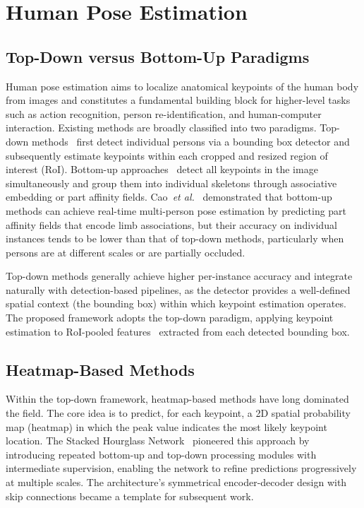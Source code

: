 \section{Human Pose Estimation}
\label{sec:rw_pose}

\subsection*{Top-Down versus Bottom-Up Paradigms}

Human pose estimation aims to localize anatomical keypoints of the human body from images and constitutes a fundamental building block for higher-level tasks such as action recognition, person re-identification, and human-computer interaction. Existing methods are broadly classified into two paradigms. Top-down methods~\cite{xiao2018simple, sun2019hrnet} first detect individual persons via a bounding box detector and subsequently estimate keypoints within each cropped and resized region of interest (RoI). Bottom-up approaches~\cite{cao2017realtime} detect all keypoints in the image simultaneously and group them into individual skeletons through associative embedding or part affinity fields. Cao~\emph{et al.}~\cite{cao2017realtime} demonstrated that bottom-up methods can achieve real-time multi-person pose estimation by predicting part affinity fields that encode limb associations, but their accuracy on individual instances tends to be lower than that of top-down methods, particularly when persons are at different scales or are partially occluded.

Top-down methods generally achieve higher per-instance accuracy and integrate naturally with detection-based pipelines, as the detector provides a well-defined spatial context (the bounding box) within which keypoint estimation operates. The proposed framework adopts the top-down paradigm, applying keypoint estimation to RoI-pooled features~\cite{he2017mask} extracted from each detected bounding box.

\subsection*{Heatmap-Based Methods}

Within the top-down framework, heatmap-based methods have long dominated the field. The core idea is to predict, for each keypoint, a 2D spatial probability map (heatmap) in which the peak value indicates the most likely keypoint location. The Stacked Hourglass Network~\cite{newell2016stacked} pioneered this approach by introducing repeated bottom-up and top-down processing modules with intermediate supervision, enabling the network to refine predictions progressively at multiple scales. The architecture's symmetrical encoder-decoder design with skip connections became a template for subsequent work.


